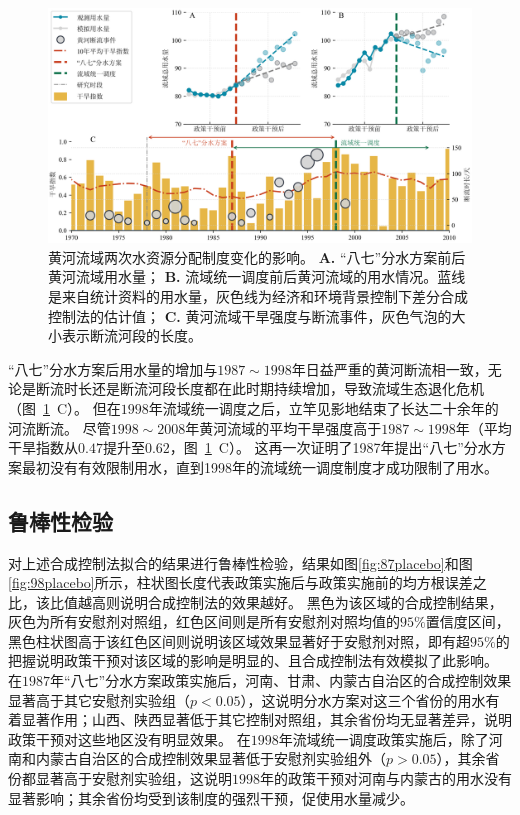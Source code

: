 \begin{figure}[!h]
	\centering
	\includegraphics[width=\linewidth]{img/ch5/ch5_results.png}
	\caption[黄河流域两次水资源分配制度变化的影响]{
        黄河流域两次水资源分配制度变化的影响。
        \textbf{A.} “八七”分水方案前后黄河流域用水量；
        \textbf{B.} 流域统一调度前后黄河流域的用水情况。蓝线是来自统计资料的用水量，灰色线为经济和环境背景控制下差分合成控制法的估计值；
        \textbf{C.} 黄河流域干旱强度与断流事件，灰色气泡的大小表示断流河段的长度。
	}\label{ch5:fig:main_results}
\end{figure}

“八七”分水方案后用水量的增加与$1987 \sim 1998$年日益严重的黄河断流相一致，无论是断流时长还是断流河段长度都在此时期持续增加，导致流域生态退化危机（图~\ref{ch5:fig:main_results}~C）。
但在$1998$年流域统一调度之后，立竿见影地结束了长达二十余年的河流断流。
尽管$1998 \sim 2008$年黄河流域的平均干旱强度高于$1987 \sim 1998$年（平均干旱指数从$0.47$提升至$0.62$，图~\ref{ch5:fig:main_results}~C）。
这再一次证明了1987年提出“八七”分水方案最初没有有效限制用水，直到1998年的流域统一调度制度才成功限制了用水。

\subsection{鲁棒性检验}

对上述合成控制法拟合的结果进行鲁棒性检验，结果如图\ref{fig:87placebo}和图\ref{fig:98placebo}所示，柱状图长度代表政策实施后与政策实施前的均方根误差之比，该比值越高则说明合成控制法的效果越好。
黑色为该区域的合成控制结果，灰色为所有安慰剂对照组，红色区间则是所有安慰剂对照均值的$95\%$置信度区间，黑色柱状图高于该红色区间则说明该区域效果显著好于安慰剂对照，即有超$95\%$的把握说明政策干预对该区域的影响是明显的、且合成控制法有效模拟了此影响。
在$1987$年“八七”分水方案政策实施后，河南、甘肃、内蒙古自治区的合成控制效果显著高于其它安慰剂实验组（$p < 0.05$），这说明分水方案对这三个省份的用水有着显著作用；山西、陕西显著低于其它控制对照组，其余省份均无显著差异，说明政策干预对这些地区没有明显效果。
在$1998$年流域统一调度政策实施后，除了河南和内蒙古自治区的合成控制效果显著低于安慰剂实验组外（$p > 0.05$），其余省份都显著高于安慰剂实验组，这说明$1998$年的政策干预对河南与内蒙古的用水没有显著影响；其余省份均受到该制度的强烈干预，促使用水量减少。

